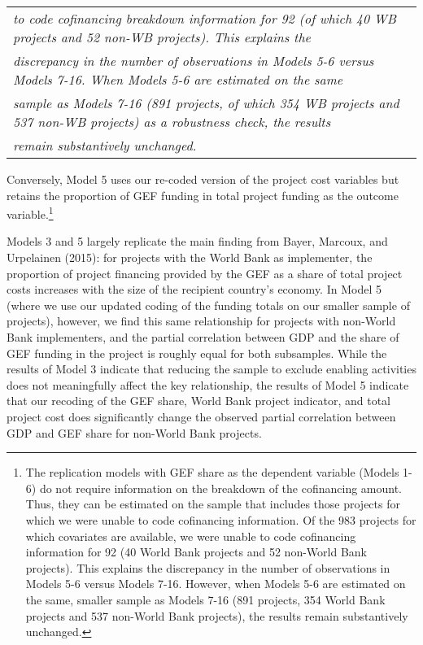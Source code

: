 \documentclass{article}
\begin{document}
\begin{singlespace}
\begin{table}[H]
{\begin{tabular}{rcccccccc}
			\multicolumn{9}{l}{\textit{to code cofinancing breakdown information for 92 (of which 40 WB projects and 52 non-WB projects). This explains the}} \\
			\multicolumn{9}{l}{\textit{discrepancy in the number of observations in Models 5-6 versus Models 7-16. When Models 5-6 are estimated on the same}} \\
			\multicolumn{9}{l}{\textit{sample as Models 7-16 (891 projects, of which 354 WB projects and 537 non-WB projects) as a robustness check, the results}} \\
			\multicolumn{9}{l}{\textit{remain substantively unchanged.}}
		\end{tabular}%
	}
\end{table}
\end{singlespace}


Conversely, Model 5 uses our re-coded version of the project cost variables but retains the proportion of GEF funding in total project funding as the outcome variable.\footnote{The replication models with GEF share as the dependent variable (Models 1-6) do not require information on the breakdown of the cofinancing amount.  Thus, they can be estimated on the sample that includes those projects for which we were unable to code cofinancing information.  Of the 983 projects for which covariates are available, we were unable to code cofinancing information for 92 (40 World Bank projects and 52 non-World Bank projects).  This explains the discrepancy in the number of observations in Models 5-6 versus Models 7-16.  However, when Models 5-6 are estimated on the same, smaller sample as Models 7-16 (891 projects, 354 World Bank projects and 537 non-World Bank projects), the results remain substantively unchanged.}							
   
Models 3 and 5 largely replicate the main finding from Bayer, Marcoux, and Urpelainen (2015): for projects with the World Bank as implementer, the proportion of project financing provided by the GEF as a share of total project costs increases with the size of the recipient country’s economy.  In Model 5 (where we use our updated coding of the funding totals on our smaller sample of projects), however, we find this same relationship for projects with non-World Bank implementers, and the partial correlation between GDP and the share of GEF funding in the project is roughly equal for both subsamples.  While the results of Model 3 indicate that reducing the sample to exclude enabling activities does not meaningfully affect the key relationship, the results of Model 5 indicate that our recoding of the GEF share, World Bank project indicator, and total project cost does significantly change the observed partial correlation between GDP and GEF share for non-World Bank projects.
\end{document}
